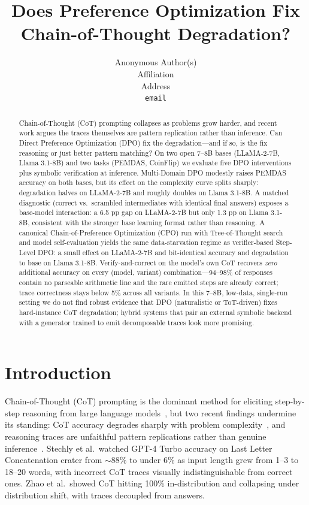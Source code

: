 \documentclass{article}
\title{Does Preference Optimization Fix Chain-of-Thought Degradation?}
\author{
  Anonymous Author(s) \\
  Affiliation \\
  Address \\
  \texttt{email}
}
\begin{document}
\maketitle

\begin{abstract}
Chain-of-Thought (CoT) prompting collapses as problems grow harder, and recent work argues the traces themselves are pattern replication rather than inference. Can Direct Preference Optimization (DPO) fix the degradation---and if so, is the fix reasoning or just better pattern matching? On two open 7--8B bases (LLaMA-2-7B, Llama 3.1-8B) and two tasks (PEMDAS, CoinFlip) we evaluate five DPO interventions plus symbolic verification at inference. Multi-Domain DPO modestly raises PEMDAS accuracy on both bases, but its effect on the complexity curve splits sharply: degradation halves on LLaMA-2-7B and roughly doubles on Llama 3.1-8B. A matched diagnostic (correct vs.\ scrambled intermediates with identical final answers) exposes a base-model interaction: a 6.5 pp gap on LLaMA-2-7B but only 1.3 pp on Llama 3.1-8B, consistent with the stronger base learning format rather than reasoning. A canonical Chain-of-Preference Optimization (CPO) run with Tree-of-Thought search and model self-evaluation yields the same data-starvation regime as verifier-based Step-Level DPO: a small effect on LLaMA-2-7B and bit-identical accuracy and degradation to base on Llama 3.1-8B. Verify-and-correct on the model's own CoT recovers \emph{zero} additional accuracy on every (model, variant) combination---94--98\% of responses contain no parseable arithmetic line and the rare emitted steps are already correct; trace correctness stays below 5\% across all variants. In this 7--8B, low-data, single-run setting we do not find robust evidence that DPO (naturalistic or ToT-driven) fixes hard-instance CoT degradation; hybrid systems that pair an external symbolic backend with a generator trained to emit decomposable traces look more promising.
\end{abstract}

\section{Introduction}

Chain-of-Thought (CoT) prompting is the dominant method for eliciting step-by-step reasoning from large language models~\cite{wei2022cot}, but two recent findings undermine its standing: CoT accuracy degrades sharply with problem complexity~\cite{stechly2024thoughtlessness}, and reasoning traces are unfaithful pattern replications rather than genuine inference~\cite{zhao2024mirage}. Stechly et al.\ watched GPT-4 Turbo accuracy on Last Letter Concatenation crater from ${\sim}88\%$ to under 6\% as input length grew from 1--3 to 18--20 words, with incorrect CoT traces visually indistinguishable from correct ones. Zhao et al.\ showed CoT hitting 100\% in-distribution and collapsing under distribution shift, with traces decoupled from answers.
\end{document}
